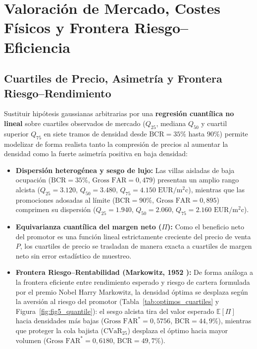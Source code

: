 \section{Valoración de Mercado, Costes Físicos y Frontera Riesgo--Eficiencia}
\label{sec:mercado_economico}

\subsection{Cuartiles de Precio, Asimetría y Frontera Riesgo--Rendimiento}
\label{sub:cuartiles_mercado}

Sustituir hipótesis gaussianas arbitrarias por una \textbf{regresión cuantílica no lineal} sobre cuartiles observados de mercado ($Q_{25}$, mediana $Q_{50}$ y cuartil superior $Q_{75}$ en siete tramos de densidad desde $\text{BCR} = 35\%$ hasta $90\%$) permite modelizar de forma realista tanto la compresión de precios al aumentar la densidad como la fuerte asimetría positiva en baja densidad:

\begin{itemize}
  \item \textbf{Dispersión heterogénea y sesgo de lujo:} Las villas aisladas de baja ocupación ($\text{BCR} = 35\%$, $\text{Gross FAR} = 0,479$) presentan un amplio rango alcista ($Q_{25} = 3.120$, $Q_{50} = 3.480$, $Q_{75} = 4.150\text{ EUR}/\text{m}^2\text{c}$), mientras que las promociones adosadas al límite ($\text{BCR} = 90\%$, $\text{Gross FAR} = 0,895$) comprimen su dispersión ($Q_{25} = 1.940$, $Q_{50} = 2.060$, $Q_{75} = 2.160\text{ EUR}/\text{m}^2\text{c}$).
  \item \textbf{Equivarianza cuantílica del margen neto ($\Pi$):} Como el beneficio neto del promotor es una función lineal estrictamente creciente del precio de venta $P$, los cuartiles de precio se trasladan de manera exacta a cuartiles de margen neto sin error estadístico de muestreo.
  \item \textbf{Frontera Riesgo--Rentabilidad (Markowitz, 1952 \cite{markowitz1952portfolio}):} De forma análoga a la frontera eficiente entre rendimiento esperado y riesgo de cartera formulada por el premio Nobel Harry Markowitz, la densidad óptima se desplaza según la aversión al riesgo del promotor (Tabla~\ref{tab:optimos_cuartiles} y Figura~\ref{fig:fig5_quantile}): el sesgo alcista tira del valor esperado $\mathbb{E}[\Pi]$ hacia densidades más bajas ($\text{Gross FAR}^* = 0,5756$, $\text{BCR} = 44,9\%$), mientras que proteger la cola bajista ($\text{CVaR}_{25}$) desplaza el óptimo hacia mayor volumen ($\text{Gross FAR}^* = 0,6180$, $\text{BCR} = 49,7\%$).
\end{itemize}

